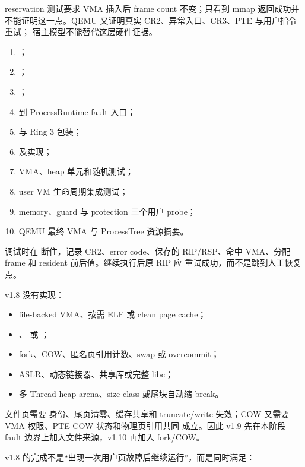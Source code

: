 reservation 测试要求 VMA 插入后 frame count 不变；只看到 mmap 返回成功并
不能证明这一点。QEMU 又证明真实 CR2、异常入口、CR3、PTE 与用户指令重试；
宿主模型不能替代这层硬件证据。

\par
\begin{enumerate}
  \item {}；
  \item {}；
  \item {}；
  \item {} 到 ProcessRuntime fault 入口；
  \item {} 与 Ring 3 包装；
  \item {} 及实现；
  \item VMA、heap 单元和随机测试；
  \item user VM 生命周期集成测试；
  \item memory、guard 与 protection 三个用户 probe；
  \item QEMU 最终 VMA 与 ProcessTree 资源摘要。
\end{enumerate}

调试时在  断住，记录 CR2、error code、保存的
RIP/RSP、命中 VMA、分配 frame 和 resident 前后值。继续执行后原 RIP 应
重试成功，而不是跳到人工恢复点。

v1.8 没有实现：

\begin{itemize}
  \item file-backed VMA、按需 ELF 或 clean page cache；
  \item {}、 或 ；
  \item fork、COW、匿名页引用计数、swap 或 overcommit；
  \item ASLR、动态链接器、共享库或完整 libc；
  \item 多 Thread heap arena、size class 或尾块自动缩 break。
\end{itemize}

文件页需要  身份、尾页清零、缓存共享和
truncate/write 失效；COW 又需要 VMA 权限、PTE COW 状态和物理页引用共同
成立。因此 v1.9 先在本阶段 fault 边界上加入文件来源，v1.10 再加入 fork/COW。

v1.8 的完成不是“出现一次用户页故障后继续运行”，而是同时满足：

